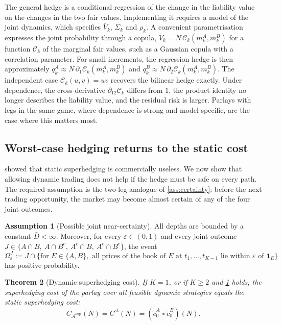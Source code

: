 \documentclass[11pt,a4paper]{article}
\theoremstyle{plain}
\newtheorem{theorem}{Theorem}[section]
\theoremstyle{definition}
\newtheorem{assumption}[theorem]{Assumption}
\theoremstyle{remark}
\newcommand{\1}{\mathbf{1}}
\newcommand{\infconv}{\mathbin{\square}}
\begin{document}
The general hedge is a conditional regression of the change in the liability value on the changes in the two fair values. Implementing it requires a model of the joint dynamics, which specifies $\bar V_k$, $\Sigma_k$ and $\rho_k$. A convenient parametrisation expresses the joint probability through a copula, $\bar V_k = N\,\mathcal{C}_k(m^A_k,m^B_k)$ for a function $\mathcal{C}_k$ of the marginal fair values, such as a Gaussian copula with a correlation parameter. For small increments, the regression hedge is then approximately $q^A_k\approx N\,\partial_1\mathcal{C}_k(m^A_k,m^B_k)$ and $q^B_k\approx N\,\partial_2\mathcal{C}_k(m^A_k,m^B_k)$. The independent case $\mathcal{C}_k(u,v) = uv$ recovers the bilinear hedge exactly. Under dependence, the cross-derivative $\partial_{12}\mathcal{C}_k$ differs from $1$, the product identity no longer describes the liability value, and the residual risk is larger. Parlays with legs in the same game, where dependence is strong and model-specific, are the case where this matters most.

\subsection{Worst-case hedging returns to the static cost}

 showed that static superhedging is commercially useless. We now show that allowing dynamic trading does not help if the hedge must be safe on every path. The required assumption is the two-leg analogue of \cref{ass:certainty}: before the next trading opportunity, the market may become almost certain of any of the four joint outcomes.

\begin{assumption}[Possible joint near-certainty]
\label{ass:joint-certainty}
All depths are bounded by a constant $\bar D<\infty$. Moreover, for every $\varepsilon\in(0,1)$ and every joint outcome $J\in\{A\cap B,\ A\cap B^c,\ A^c\cap B,\ A^c\cap B^c\}$, the event
\[
\Omega^J_\varepsilon := J\cap\bigl\{\text{for } E\in\{A,B\}, \text{ all prices of the book of } E \text{ at } t_1,\dots,t_{K-1} \text{ lie within } \varepsilon \text{ of } \1_E\bigr\}
\]
has positive probability.
\end{assumption}

\begin{theorem}[Dynamic superhedging cost]
\label{thm:dynamic-super}
If $K=1$, or if $K\geq 2$ and \cref{ass:joint-certainty} holds, the superhedging cost of the parlay over all feasible dynamic strategies equals the static superhedging cost:
\[
C_{\mathcal{A}^{\mathrm{sup}}}(N) = C^{\mathrm{st}}(N) = (\tilde c^A_0\infconv\tilde c^B_0)(N).
\]
\end{theorem}
\end{document}
